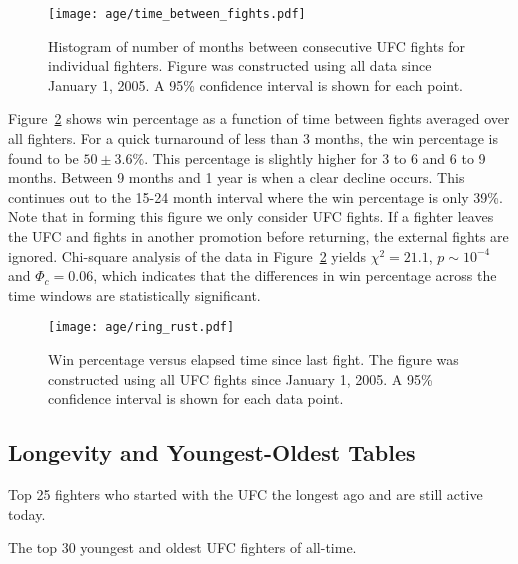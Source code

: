 \begin{figure}[h]
\begin{center}
\texttt{[image: age/time\_between\_fights.pdf]}
\caption{Histogram of number of months between consecutive UFC fights
for individual fighters. Figure was constructed using all data since
January 1, 2005. A 95\% confidence interval is shown for each point.}
\label{time_between_fights}
\end{center}
\end{figure}

Figure~\ref{ring_rust} shows win percentage as a function
of time between fights averaged over all fighters.
For a quick turnaround of less than 3 months, the win percentage
is found to be $50\pm3.6\%$. This percentage is slightly
higher for 3 to 6 and 6 to 9 months.  Between 9 months
and 1 year is when a clear decline occurs. This continues
out to the 15-24 month interval where the win percentage
is only 39\%.
Note that in forming this figure we only consider UFC fights. If a fighter
leaves the UFC and fights in another promotion before returning, the
external fights are ignored. Chi-square analysis of the
data in Figure~\ref{ring_rust} yields
$\chi^2=21.1$, $p \sim 10^{-4}$ and $\Phi_c=0.06$, which
indicates that the differences in win percentage across the
time windows are statistically significant.

\begin{figure}[h]
\begin{center}
\texttt{[image: age/ring\_rust.pdf]}
\caption{Win percentage versus elapsed time since last fight. The figure
was constructed using all UFC fights since January 1, 2005. A
95\% confidence interval is shown for each data point.}
\label{ring_rust}
\end{center}
\end{figure}

\clearpage
\subsection*{Longevity and Youngest-Oldest Tables}

\begin{center}
\begin{table}[h]

\caption{Top 25 fighters who started with the UFC the longest ago and are still active today.}
\end{table}
\end{center}

\begin{center}
\begin{table}[h]

\caption{The top 30 youngest and oldest UFC fighters of all-time.}
\end{table}
\end{center}
